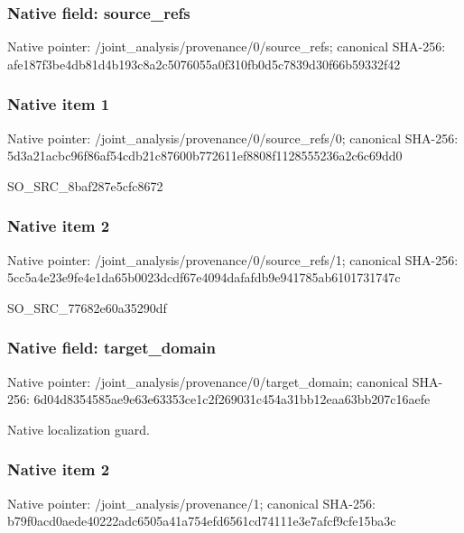 \documentclass[10pt,a4paper]{article}
\begin{document}
\subsubsection{Native field: source\_\allowbreak{}refs}
Native pointer: /joint\_\allowbreak{}analysis/provenance/0/source\_\allowbreak{}refs; canonical SHA-256: afe187f3be4db81d4b193c8a2c5076055a0f310fb0d5c7839d30f66b59332f42

\subsubsection{Native item 1}
Native pointer: /joint\_\allowbreak{}analysis/provenance/0/source\_\allowbreak{}refs/0; canonical SHA-256: 5d3a21acbc96f86af54cdb21c87600b772611ef8808f1128555236a2c6c69dd0

\begingroup\raggedright\sloppy SO\_\allowbreak{}SRC\_\allowbreak{}8baf287e5cfc8672\par\endgroup

\subsubsection{Native item 2}
Native pointer: /joint\_\allowbreak{}analysis/provenance/0/source\_\allowbreak{}refs/1; canonical SHA-256: 5cc5a4e23e9fe4e1da65b0023dcdf67e4094dafafdb9e941785ab6101731747c

\begingroup\raggedright\sloppy SO\_\allowbreak{}SRC\_\allowbreak{}77682e60a35290df\par\endgroup

\subsubsection{Native field: target\_\allowbreak{}domain}
Native pointer: /joint\_\allowbreak{}analysis/provenance/0/target\_\allowbreak{}domain; canonical SHA-256: 6d04d8354585ae9e63e63353ce1c2f269031c454a31bb12eaa63bb207c16aefe

\begingroup\raggedright\sloppy Native localization guard.\par\endgroup

\subsubsection{Native item 2}
Native pointer: /joint\_\allowbreak{}analysis/provenance/1; canonical SHA-256: b79f0acd0aede40222adc6505a41a754efd6561cd74111e3e7afcf9cfe15ba3c
\end{document}
